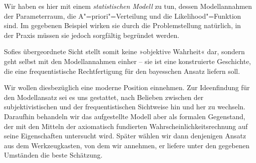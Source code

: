 Wir haben es hier mit einem \emph{statistischen Modell} zu tun, dessen
Modellannahmen der Parameterraum, die A"=priori"=Verteilung und die
Likelihood"=Funktion sind. Im gegebenen Beispiel wirken sie durch die
Problemstellung natürlich, in der Praxis müssen sie jedoch sorgfältig
begründet werden.

Sofies übergeordnete Sicht stellt somit keine »objektive Wahrheit« dar,
sondern geht selbst mit den Modellannahmen einher -- sie ist eine
konstruierte Geschichte, die eine frequentistische Rechtfertigung für
den bayesschen Ansatz liefern soll.

Wir wollen diesbezüglich eine moderne Position einnehmen. Zur Ideenfindung
für den Modellansatz sei es uns gestattet, nach Belieben zwischen der
subjektivistischen und der frequentistischen Sichtweise hin und her
zu wechseln. Daraufhin behandeln wir das aufgestellte Modell aber als
formalen Gegenstand, der mit den Mitteln der axiomatisch fundierten
Wahrscheinlichkeitsrechnung auf seine Eigenschaften untersucht wird.
Später wählen wir dann denjenigen Ansatz aus dem Werkzeugkasten, von dem wir
annehmen, er liefere unter den gegebenen Umständen die beste Schätzung.

